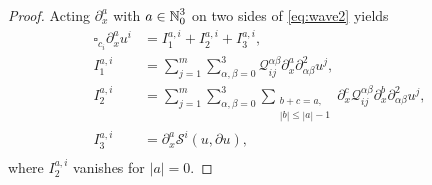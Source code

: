 \documentclass[11pt,twoside]{article}
\def\cQ{\mathcal Q}
\def\N{\mathop{\mathbb N\kern 0pt}\nolimits}
\def\p{\partial}
\theoremstyle{plain}
\theoremstyle{definition}
\numberwithin{equation}{section}
\begin{document}
\begin{proof}
	Acting $\partial_x^a$ with $a\in\N_0^3$ on two sides of \eqref{eq:wave2} yields
	\begin{equation}\label{3.5}
		\begin{aligned}
			\square_{c_i}\partial_x^a u^i &= I_1^{a,i} + I_2^{a,i} +  I_3^{a,i},\\	
			I_1^{a,i} &= \sum_{j=1}^m\sum_{\alpha,\beta=0}^3 \cQ^{\alpha\beta}_{ij} \p_x^a\partial_{\alpha\beta}^2 u^j, \\
			I_2^{a,i} &= \sum_{j=1}^m\sum_{\alpha,\beta=0}^3\sum_{\substack{b+c=a, \\ |b| \leq |a|-1}}  \p_x^c\cQ^{\alpha\beta}_{ij} \p_x^b\partial_{\alpha\beta}^2 u^j, \\
			I_3^{a,i} &= \p_x^a\mathcal{S}^i(u,\p u),\\
		\end{aligned}
	\end{equation}
	where $I_2^{a,i}$ vanishes for $|a|=0$.


\end{proof}
\end{document}
